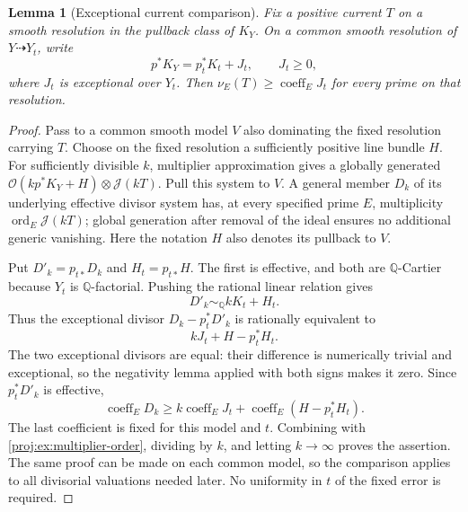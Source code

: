 \documentclass[11pt,letterpaper]{article}
\newcommand{\Q}{\mathbb{Q}}
\newcommand{\OO}{\mathcal{O}}
\DeclareMathOperator{\ord}{ord}
\newtheorem{lemma}[theorem]{Lemma}
\theoremstyle{definition}
\theoremstyle{remark}
\begin{document}
\begin{lemma}[Exceptional current comparison]\label{proj:ex:current-comparison}
Fix a positive current \(T\) on a smooth resolution in the
pullback class of \(K_Y\). On a common smooth resolution of
\(Y\dashrightarrow Y_t\), write
\[
 p^*K_Y=p_t^*K_t+J_t,\qquad J_t\geq0,
\]
where \(J_t\) is exceptional over \(Y_t\).
Then \(\nu_E(T)\geq\operatorname{coeff}_E J_t\) for every
prime on that resolution.
\end{lemma}
\begin{proof}
Pass to a common smooth model \(V\) also dominating the
fixed resolution carrying \(T\). Choose on the fixed
resolution a sufficiently positive line bundle \(H\).
For sufficiently divisible \(k\), multiplier approximation
gives a globally generated
\(\OO(kp^*K_Y+H)\otimes\mathcal J(kT)\).
Pull this system to \(V\). A general member \(D_k\) of its
underlying effective divisor system has, at every specified
prime \(E\), multiplicity
\(\ord_E\mathcal J(kT)\); global generation after removal
of the ideal ensures no additional generic vanishing.
Here the notation \(H\) also denotes its pullback to \(V\).

Put \(D'_k=p_{t*}D_k\) and \(H_t=p_{t*}H\). The first is
effective, and both are \(\Q\)-Cartier because \(Y_t\) is
\(\Q\)-factorial. Pushing the rational linear relation gives
\[
 D'_k\sim_\Q kK_t+H_t.
\]
Thus the exceptional divisor
\(D_k-p_t^*D'_k\) is rationally equivalent to
\[
 kJ_t+H-p_t^*H_t.
\]
The two exceptional divisors are equal: their difference is
numerically trivial and exceptional, so the negativity lemma
applied with both signs makes it zero. Since
\(p_t^*D'_k\) is effective,
\[
 \operatorname{coeff}_E D_k
 \geq k\operatorname{coeff}_E J_t
       +\operatorname{coeff}_E(H-p_t^*H_t).
 \]
The last coefficient is fixed for this model and \(t\).
Combining with \eqref{proj:ex:multiplier-order}, dividing by
\(k\), and letting \(k\to\infty\) proves the assertion.
The same proof can be made on each common model, so the
comparison applies to all divisorial valuations needed
later. No uniformity in \(t\) of the fixed error is required.
\end{proof}
\end{document}

